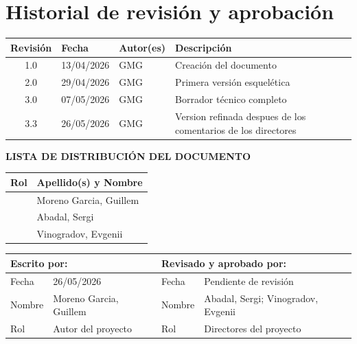 \vspace*{0cm}

\chapter*{Historial de revisión y aprobación}
{}

\begin{tabularx}{\textwidth}{|c|l|l|X|}
  \hline
    \textbf{Revisión} & \textbf{Fecha} & \textbf{Autor(es)} & \textbf{Descripción} \\
  \hline
    1.0 & 13/04/2026 & GMG & Creación del documento \\
  \hline
    2.0 & 29/04/2026 & GMG & Primera versión esquelética \\
  \hline
    3.0 & 07/05/2026 & GMG & Borrador técnico completo \\
  \hline
    3.3 & 26/05/2026 & GMG & Version refinada despues de los comentarios de los directores \\
  \hline
\end{tabularx}

\vspace{1cm}

\textbf{LISTA DE DISTRIBUCIÓN DEL DOCUMENTO}

\begin{tabularx}{\textwidth}{|l|X|}
  \hline
    \textbf{Rol} & \textbf{Apellido(s) y Nombre} \\
  \hline
    [Estudiante] & Moreno Garcia, Guillem \\
  \hline
    [Director del proyecto] & Abadal, Sergi \\
  \hline
    [Director 2 (sólo si aplica)] & Vinogradov, Evgenii \\
  \hline
\end{tabularx}

\vspace{1cm}

\begin{tabularx}{\textwidth}{|l|X||l|X|}
  \hline
    \multicolumn{2}{|l||}{\textbf{Escrito por:}}  &  \multicolumn{2}{l|}{\textbf{Revisado y aprobado por:}} \\
  \hline
    Fecha &  26/05/2026 & Fecha &  Pendiente de revisión \\
  \hline
    Nombre &  Moreno Garcia, Guillem & Nombre &  Abadal, Sergi; Vinogradov, Evgenii \\
  \hline
    Rol & Autor del proyecto & Rol & Directores del proyecto \\
  \hline
\end{tabularx}
